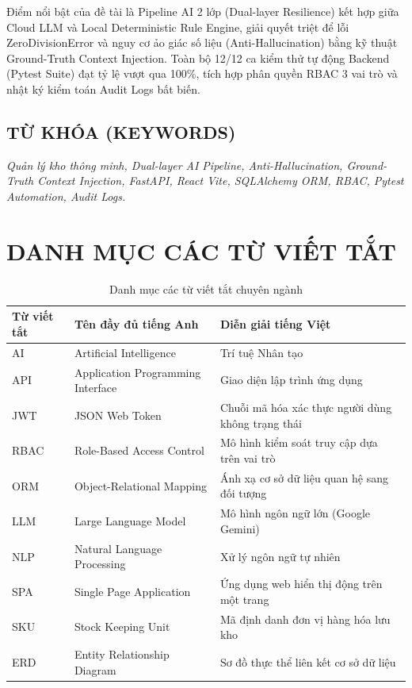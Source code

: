 \documentclass[12pt,a4paper,oneside]{report}
\begin{document}
Điểm nổi bật của đề tài là Pipeline AI 2 lớp (Dual-layer Resilience) kết hợp giữa Cloud LLM và Local Deterministic Rule Engine, giải quyết triệt để lỗi ZeroDivisionError và nguy cơ ảo giác số liệu (Anti-Hallucination) bằng kỹ thuật Ground-Truth Context Injection. Toàn bộ 12/12 ca kiểm thử tự động Backend (Pytest Suite) đạt tỷ lệ vượt qua 100\%, tích hợp phân quyền RBAC 3 vai trò và nhật ký kiểm toán Audit Logs bất biến.

\section*{TỪ KHÓA (KEYWORDS)}
\textit{Quản lý kho thông minh, Dual-layer AI Pipeline, Anti-Hallucination, Ground-Truth Context Injection, FastAPI, React Vite, SQLAlchemy ORM, RBAC, Pytest Automation, Audit Logs.}

\newpage

\chapter*{DANH MỤC CÁC TỪ VIẾT TẮT}
\begin{table}[htbp]
\centering
\begin{tabularx}{\textwidth}{|l|X|X|}
\hline
\textbf{Từ viết tắt} & \textbf{Tên đầy đủ tiếng Anh} & \textbf{Diễn giải tiếng Việt} \\
\hline
AI & Artificial Intelligence & Trí tuệ Nhân tạo \\
API & Application Programming Interface & Giao diện lập trình ứng dụng \\
JWT & JSON Web Token & Chuỗi mã hóa xác thực người dùng không trạng thái \\
RBAC & Role-Based Access Control & Mô hình kiểm soát truy cập dựa trên vai trò \\
ORM & Object-Relational Mapping & Ánh xạ cơ sở dữ liệu quan hệ sang đối tượng \\
LLM & Large Language Model & Mô hình ngôn ngữ lớn (Google Gemini) \\
NLP & Natural Language Processing & Xử lý ngôn ngữ tự nhiên \\
SPA & Single Page Application & Ứng dụng web hiển thị động trên một trang \\
SKU & Stock Keeping Unit & Mã định danh đơn vị hàng hóa lưu kho \\
ERD & Entity Relationship Diagram & Sơ đồ thực thể liên kết cơ sở dữ liệu \\
\hline
\end{tabularx}
\caption{Danh mục các từ viết tắt chuyên ngành}
\label{tab:abbr}
\end{table}
\end{document}
